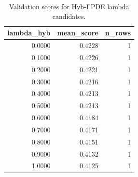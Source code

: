 \begin{table}[t]
\caption{Validation scores for Hyb-FPDE lambda candidates.}
\label{tab:lambda_distribution_computed}
\centering
\begin{tabular}{rrr}
\toprule
lambda\_hyb & mean\_score & n\_rows \\
\midrule
0.0000 & 0.4228 & 1 \\
0.1000 & 0.4226 & 1 \\
0.2000 & 0.4221 & 1 \\
0.3000 & 0.4216 & 1 \\
0.4000 & 0.4213 & 1 \\
0.5000 & 0.4213 & 1 \\
0.6000 & 0.4184 & 1 \\
0.7000 & 0.4171 & 1 \\
0.8000 & 0.4151 & 1 \\
0.9000 & 0.4132 & 1 \\
1.0000 & 0.4125 & 1 \\
\bottomrule
\end{tabular}

\end{table}
